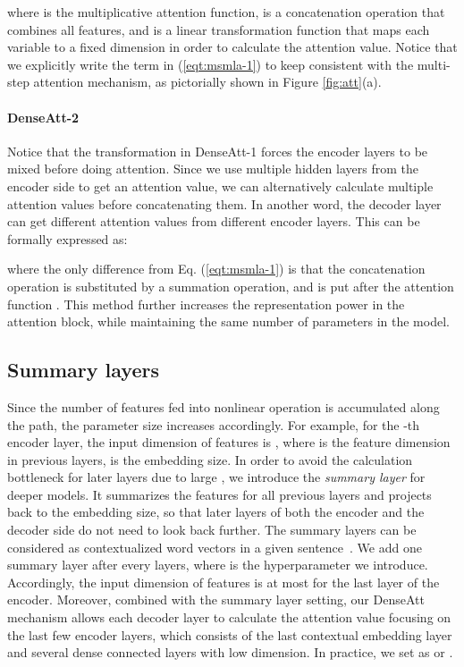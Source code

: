 \documentclass[11pt,a4paper]{article}
\begin{document}
where  is the multiplicative attention function,  is a concatenation operation that combines all features, and  is a linear transformation function that maps each variable to a fixed dimension in order to calculate the attention value. Notice that we explicitly write the  term in (\ref{eqt:msmla-1}) to keep consistent with the multi-step attention mechanism, as pictorially shown in Figure \ref{fig:att}(a).

\paragraph{DenseAtt-2}
Notice that the transformation  in DenseAtt-1 forces the encoder layers to be mixed before doing attention. 
Since we use multiple hidden layers from the encoder side to get an attention value, we can alternatively calculate multiple attention values before concatenating them. 
In another word, the decoder layer can get different attention values from different encoder layers. 
This can be formally expressed as: 

where the only difference from  Eq. (\ref{eqt:msmla-1}) is that the concatenation operation is substituted by a summation operation, and is put after the attention function . 
This method further increases the representation power in the attention block, while maintaining the same number of parameters in the model. 


\subsection{Summary layers}
Since the number of features fed into nonlinear operation is accumulated along the path, the parameter size increases accordingly. 
For example, for the -th encoder  layer, the input dimension of features is   , where  is the feature dimension in previous layers,  is the embedding size. 
In order to avoid the calculation bottleneck for later layers due to large , we introduce the \textit{summary layer} for deeper models.
It summarizes the features for all previous layers and projects back to the embedding size, so that later layers of both the encoder and the decoder side do not need to look back further.
The summary layers can be considered as contextualized word vectors in a given sentence~\cite{mccann2017learned}. 
We add one summary layer after every  layers, where  is the hyperparameter we introduce. 
Accordingly, the input dimension of features is at most   for the last layer of the encoder.
Moreover, combined with the summary layer setting, our DenseAtt mechanism allows each decoder layer to calculate the attention value focusing on the last few encoder layers, which consists of the last contextual embedding layer and several dense connected layers with low dimension. In practice, we set  as  or .
\end{document}
